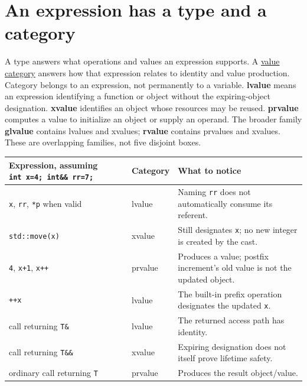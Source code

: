 \section{An expression has a type and a category}\label{01-foundations-i-ch003-an-expression-has-a-type-and-a-category}

\hypertarget{01-foundations-i-ch003-an-expression-has-a-type-and-a-category}{}

A type answers what operations and values an expression supports. A \hyperref[appendix-1121b30eaeb0]{value category} answers how that expression relates to identity and value production. Category belongs to an expression, not permanently to a variable. \textbf{lvalue} means an expression identifying a function or object without the expiring-object designation. \textbf{xvalue} identifies an object whose resources may be reused. \textbf{prvalue} computes a value to initialize an object or supply an operand. The broader family \textbf{glvalue} contains lvalues and xvalues; \textbf{rvalue} contains prvalues and xvalues. These are overlapping families, not five disjoint boxes.

{\def\LTcaptype{none} %
\begin{longtable}[]{@{}
  >{\raggedright\arraybackslash}p{}
  >{\raggedright\arraybackslash}p{}
  >{\raggedright\arraybackslash}p{}@{}}
\toprule\noalign{}
\begin{minipage}[b]{\linewidth}\raggedright
Expression, assuming \texttt{int\ x=4;\ int\&\&\ rr=7;}
\end{minipage} & \begin{minipage}[b]{\linewidth}\raggedright
Category
\end{minipage} & \begin{minipage}[b]{\linewidth}\raggedright
What to notice
\end{minipage} \\
\midrule\noalign{}
\endhead
\bottomrule\noalign{}
\endlastfoot
\texttt{x}, \texttt{rr}, \texttt{*p} when valid & lvalue & Naming \texttt{rr} does not automatically consume its referent. \\
\texttt{std::move(x)} & xvalue & Still designates \texttt{x}; no new integer is created by the cast. \\
\texttt{4}, \texttt{x+1}, \texttt{x++} & prvalue & Produces a value; postfix increment's old value is not the updated object. \\
\texttt{++x} & lvalue & The built-in prefix operation designates the updated \texttt{x}. \\
call returning \texttt{T\&} & lvalue & The returned access path has identity. \\
call returning \texttt{T\&\&} & xvalue & Expiring designation does not itself prove lifetime safety. \\
ordinary call returning \texttt{T} & prvalue & Produces the result object/value. \\
\end{longtable}
}

